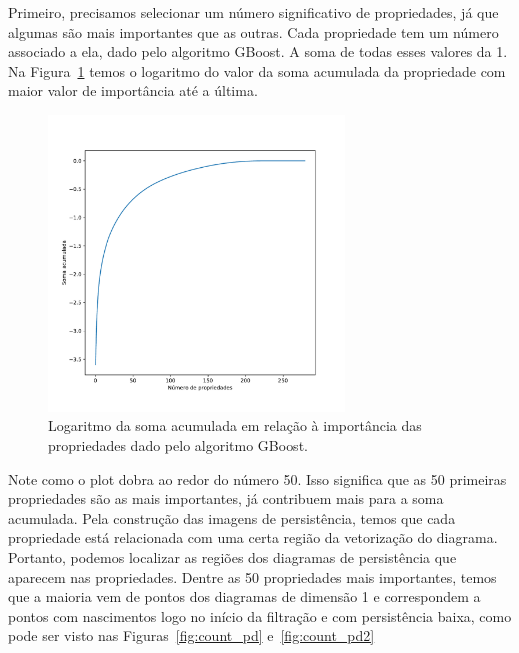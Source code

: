 Primeiro, precisamos selecionar um número significativo de propriedades, já que algumas são
mais importantes que as outras. Cada propriedade tem um número associado a ela, dado pelo
algoritmo GBoost. A soma de todas esses valores da 1. Na Figura~\ref{fig:knee_plot} temos 
o logaritmo do valor da soma acumulada da propriedade com maior valor de importância até a última. 
\begin{figure}
    \centering
    \includegraphics[width=0.7\textwidth]{images/plt_ankle.pdf}
    \caption{Logaritmo da soma acumulada em relação à importância das propriedades dado pelo algoritmo
    GBoost.}
    \label{fig:knee_plot}
    \fautor
\end{figure}
Note como o plot dobra ao redor do número 50. Isso significa que as 50 primeiras propriedades são
as mais importantes, já contribuem mais para a soma acumulada. Pela construção das imagens
de persistência, temos que cada propriedade está relacionada com uma certa região da vetorização
do diagrama. Portanto, podemos localizar as regiões dos diagramas de persistência que 
aparecem nas propriedades. Dentre as 50 propriedades mais importantes, temos que a maioria
vem de pontos dos diagramas de dimensão 1 e correspondem a pontos com nascimentos logo
no início da filtração e com persistência baixa, como pode ser visto nas Figuras~\ref{fig:count_pd}
e~\ref{fig:count_pd2}
